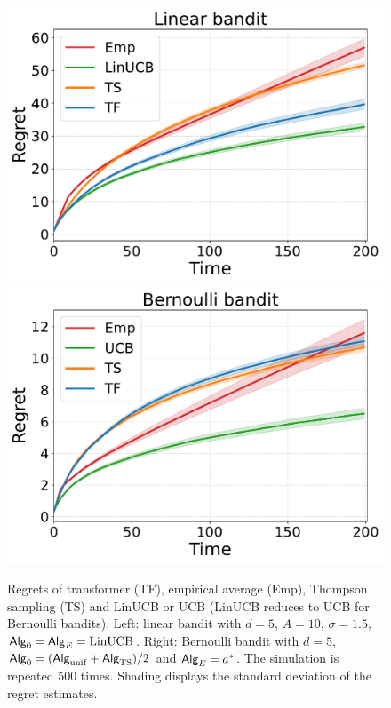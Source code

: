 



\begin{figure}[t]
\centering  %
\includegraphics[width=0.35\linewidth]{Sections/figs/record_2_cum_True.pdf}
\hspace{2em}
\includegraphics[width=0.35\linewidth]{Sections/figs/record_1_cum_True.pdf}
\vspace{-1em}
\caption{Regrets of transformer (TF), empirical average (Emp), Thompson sampling (TS) and LinUCB or UCB (LinUCB reduces to UCB for Bernoulli bandits). Left: linear bandit with $d=5$, $A=10$, $\sigma=1.5$, ${\mathsf{Alg}}_0={\mathsf{Alg}}_{E}={\mathrm{LinUCB}}$. Right: Bernoulli bandit with $d=5$, ${\mathsf{Alg}}_0=({\mathsf{Alg}}_{\mathrm{unif}}+{\mathsf{Alg}}_{{\mathrm{TS}}})/2$ and ${\mathsf{Alg}}_{E}={a}^*$. The simulation is repeated 500 times. Shading displays the standard deviation of the regret estimates. } 
\label{fig:regret_1} 
\end{figure}

